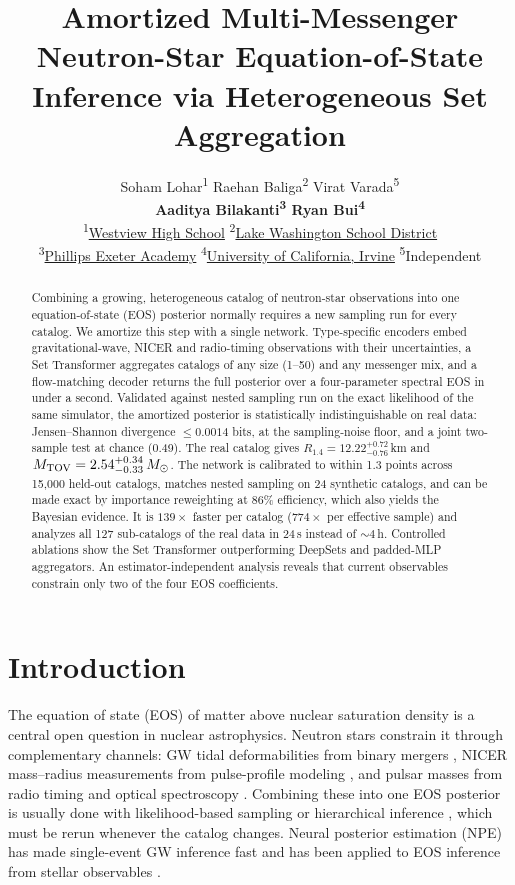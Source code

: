 \documentclass{article}
\title{Amortized Multi-Messenger Neutron-Star Equation-of-State Inference via Heterogeneous Set Aggregation}
\author{%
  Soham Lohar\textsuperscript{1} \quad Raehan Baliga\textsuperscript{2} \quad Virat Varada\textsuperscript{5}\\
  \textbf{Aaditya Bilakanti\textsuperscript{3} \quad Ryan Bui\textsuperscript{4}}\\[4pt]
  \textsuperscript{1}\href{https://westview.beaverton.k12.or.us/}{Westview High School} \quad
  \textsuperscript{2}\href{https://www.lwsd.org/}{Lake Washington School District}\\
  \textsuperscript{3}\href{https://exeter.edu/}{Phillips Exeter Academy} \quad
  \textsuperscript{4}\href{https://uci.edu/}{University of California, Irvine} \quad
  \textsuperscript{5}Independent}
\newcommand{\Msun}{M_\odot}
\begin{document}
\maketitle

\begin{abstract}
Combining a growing, heterogeneous catalog of neutron-star observations into one equation-of-state (EOS) posterior normally requires a new sampling run for every catalog. We amortize this step with a single network. Type-specific encoders embed gravitational-wave, NICER and radio-timing observations with their uncertainties, a Set Transformer aggregates catalogs of any size (1--50) and any messenger mix, and a flow-matching decoder returns the full posterior over a four-parameter spectral EOS in under a second. Validated against nested sampling run on the exact likelihood of the same simulator, the amortized posterior is statistically indistinguishable on real data: Jensen--Shannon divergence $\le0.0014$ bits, at the sampling-noise floor, and a joint two-sample test at chance (0.49). The real catalog gives $R_{1.4}=12.22^{+0.72}_{-0.76}$\,km and $M_{\rm TOV}=2.54^{+0.34}_{-0.33}\,\Msun$. The network is calibrated to within 1.3 points across 15,000 held-out catalogs, matches nested sampling on 24 synthetic catalogs, and can be made exact by importance reweighting at 86\% efficiency, which also yields the Bayesian evidence. It is $139\times$ faster per catalog ($774\times$ per effective sample) and analyzes all 127 sub-catalogs of the real data in 24\,s instead of ${\sim}4$\,h. Controlled ablations show the Set Transformer outperforming DeepSets and padded-MLP aggregators. An estimator-independent analysis reveals that current observables constrain only two of the four EOS coefficients.
\end{abstract}

\section{Introduction}

The equation of state (EOS) of matter above nuclear saturation density is a central open question in nuclear astrophysics. Neutron stars constrain it through complementary channels: GW tidal deformabilities from binary mergers \citep{abbott2017gw170817,abbott2020gw190425}, NICER mass--radius measurements from pulse-profile modeling \citep{miller2019psr,riley2019nicer,miller2021radius,riley2021nicer,choudhury2024j0437}, and pulsar masses from radio timing and optical spectroscopy \citep{demorest2010twosolar,fonseca2021refined,romani2022psr}. Combining these into one EOS posterior is usually done with likelihood-based sampling \citep{ashton2019bilby,speagle2020dynesty} or hierarchical inference \citep{golomb2022hierarchical,ray2023rapid}, which must be rerun whenever the catalog changes. Neural posterior estimation (NPE) \citep{cranmer2020frontier} has made single-event GW inference fast \citep{dax2021real,dax2025realtime} and has been applied to EOS inference from stellar observables \citep{carvalho2025neural}.
\end{document}
